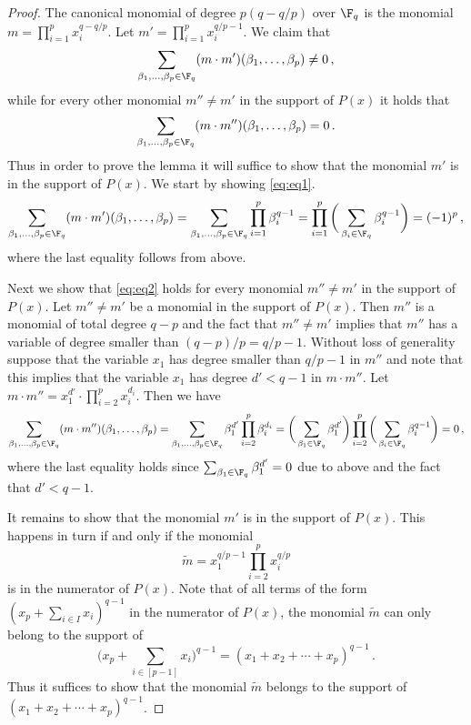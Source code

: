 \begin{proof}
The canonical monomial of degree $p(q-q/p)$ over $\F_q$ is the monomial $m = \prod_{i=1}^{p} x_i^{q-q/p}$. Let $m' = \prod_{i=1}^p x_i^{q/p-1}$.
We claim that
\begin{equation}\label{eq:eq1}
 \sum_{\beta_1,\ldots,\beta_p \in \F_q} (m \cdot m')(\beta_1,\ldots, \beta_p)  \neq 0\,,
 \end{equation}
 while for every other
monomial $m'' \neq m'$ in the support of
$P(x)$ it holds that
\begin{equation}\label{eq:eq2}
\sum_{\beta_1,\ldots,\beta_p \in \F_q}(m \cdot m'')(\beta_1,\ldots,\beta_p) =0\,.
\end{equation}
Thus in order to prove the lemma it will suffice to show that the monomial $m'$
is in the support of $P(x)$.
We start by showing \eqref{eq:eq1}. %
$$
\sum_{\beta_1,\ldots,\beta_p \in \F_q} (m \cdot m')(\beta_1,\ldots, \beta_p)   =  \sum_{\beta_1,\ldots,\beta_p \in \F_q}    \prod_{i=1}^{p} \beta_i^{q-1}
  = \prod_{i=1}^p \bigg( \sum_{\beta_i \in \F_q} \beta_i^{q-1} \bigg) =  (-1)^p  \,,
$$
where the last equality follows from  above.


Next we show that \eqref{eq:eq2} holds for every monomial $m'' \neq m'$ in the support of $P(x)$.
%
Let $m'' \neq m'$ be a monomial in the support of $P(x)$. Then
 $m''$ is a monomial of total degree $q-p$ and the fact that $m'' \neq m'$ implies that $m'' $ has a variable of degree smaller than
 $(q-p)/p = q/p - 1$. Without loss of generality suppose that the variable $x_1$ has degree smaller than  $q/p - 1$ in $m''$ and note that this implies
 that the variable $x_1$  has degree $d' < q-1$ in $m \cdot m''$. Let $m \cdot m'' = x_1^{d'} \cdot \prod_{i=2}^{p} x_i^{d_i}$. Then we have
%
%
%
%
\begin{equation*}
 \sum_{\beta_1,\ldots,\beta_p \in \F_q} (m \cdot m'')(\beta_1,\ldots, \beta_p)    =\sum_{\beta_1,\ldots,\beta_p \in \F_q}   \beta_1^{d'}  \prod_{i=2}^{p} \beta_i^{d_i} 
 =  \bigg(\sum_{\beta_1 \in \F_q} \beta_1^{d'} \bigg) \prod_{i=2}^p  \bigg(\sum_{\beta_i \in \F_q} \beta_i^{q-1} \bigg)= 0\,, 
\end{equation*}
where the last equality holds since $\sum_{\beta_1 \in \F_q} \beta_1^{d'}=0$ due to  above and the fact that $d' < q-1$.

%
%
 It remains to show that
the monomial $m'$ is in the support of $P(x)$. This happens in turn if
and only if the monomial
\[
{\widetilde m} = x_1^{q/p-1} \prod_{i=2}^p x_i^{q/p}
\]
is in the numerator of $P(x)$.
Note that of all terms of the form $(x_p + \sum_{i \in I}x_i)^{q-1}$ in the numerator of $P(x)$, the monomial $\widetilde m$
can only belong to the support of $$\bigg(x_p + \sum_{i \in [p-1]} x_i\bigg)^{q-1} = (x_1 + x_2 + \cdots + x_p)^{q-1}\,.$$ Thus it suffices
to show that the monomial $\widetilde m$ belongs to the support of $(x_1 + x_2 + \cdots + x_p)^{q-1}$.


\end{proof}
